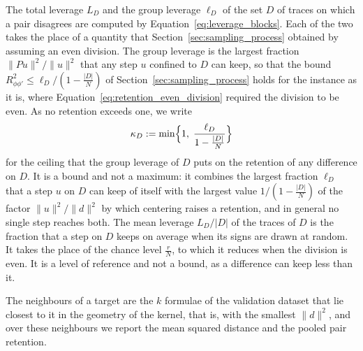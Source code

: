\documentclass[titlepage,a4paper,11pt]{report}
\DeclareRobustCommand{\RStodo}[1]{\leavevmode{\color{orange!85!black}\textbf{[TODO:}~#1\textbf{]}}}
\newenvironment{RSnewblock}{\par\color{blue!65!black}}{\par}
\begin{document}
\begin{RSnewblock}
    The total leverage $L_D$ and the group leverage $\ell_D$ of the set $D$ of traces on which a pair disagrees are computed by Equation~\eqref{eq:leverage_blocks}. Each of the two takes the place of a quantity that Section~\ref{sec:sampling_process} obtained by assuming an even division. The group leverage is the largest fraction $\lVert Pu\rVert^2/\lVert u\rVert^2$ that any step $u$ confined to $D$ can keep, so that the bound $R^2_{\phi\phi'}\le\ell_D/(1-\frac{|D|}{N})$ of Section~\ref{sec:sampling_process} holds for the instance as it is, where Equation~\eqref{eq:retention_even_division} required the division to be even. As no retention exceeds one, we write
    \begin{equation}\label{eq:retention_ceiling}
        \kappa_D:=\min\Bigl\{1,\;\frac{\ell_D}{1-\frac{|D|}{N}}\Bigr\}
    \end{equation}
    for the ceiling that the group leverage of $D$ puts on the retention of any difference on $D$. It is a bound and not a maximum: it combines the largest fraction $\ell_D$ that a step $u$ on $D$ can keep of itself with the largest value $1/(1-\frac{|D|}{N})$ of the factor $\lVert u\rVert^2/\lVert d\rVert^2$ by which centering raises a retention, and in general no single step reaches both. The mean leverage $L_D/|D|$ of the traces of $D$ is the fraction that a step on $D$ keeps on average when its signs are drawn at random. It takes the place of the chance level $\frac rN$, to which it reduces when the division is even. It is a level of reference and not a bound, as a difference can keep less than it.

    The neighbours of a target are the $k$ formulae of the validation dataset that lie closest to it in the geometry of the kernel, that is, with the smallest $\lVert d\rVert^2$, and over these neighbours we report the mean squared distance and the pooled pair retention. \RStodo{state $k$}
    \end{RSnewblock}
\end{document}
